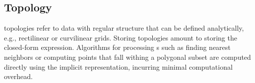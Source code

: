\subsection{\cgrid{} Topology}
\cgrid{} topologies refer to data with regular structure that can be
defined analytically, e.g., rectilinear or curvilinear grids. Storing
\cgrid{} topologies amount to storing the closed-form
expression. Algorithms for processing \cgrid{}s such as finding
nearest neighbors or computing points that fall withing a polygonal
subset are computed directly using the implicit \cgrid{}
representation, incurring minimal computational overhead.
